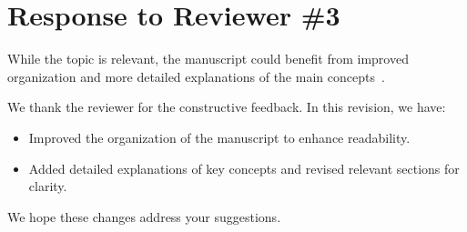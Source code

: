 \section*{Response to Reviewer \#3}
\setcounter{commentcounter}{0}

\begin{generalcomment}
While the topic is relevant, the manuscript could benefit from improved organization and more detailed explanations of the main concepts~\cite{smith2023}.
\end{generalcomment}

\begin{generalresponse}
We thank the reviewer for the constructive feedback. In this revision, we have:
\begin{itemize}
    \item Improved the organization of the manuscript to enhance readability.
    \item Added detailed explanations of key concepts and revised relevant sections for clarity.
\end{itemize}
We hope these changes address your suggestions.
\end{generalresponse}


